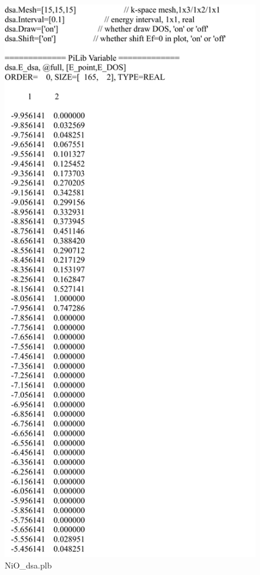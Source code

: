 \documentclass[10pt,a4paper]{article}
\begin{document}
\begin{figure}[tbp]
\centering
\includegraphics[width=0.9\columnwidth]{NiO_dsa.pdf}
\caption{NiO\_dsa.plb}
\end{figure}
\end{document}

